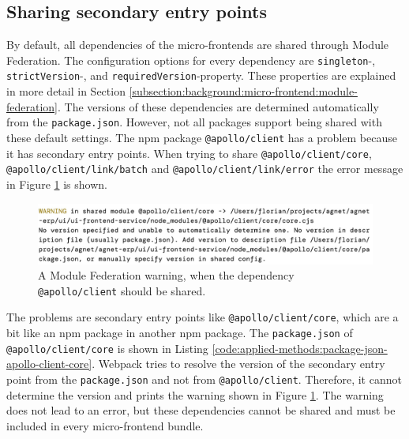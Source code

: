 \subsection{Sharing secondary entry points}\label{subsection:applied-methods:prototypical-implementation:sharing
-secondary-entrypoints}

By default, all dependencies of the micro-frontends are shared through Module Federation. The configuration options for every dependency are \texttt{singleton}-, \texttt{strictVersion}-, and \texttt{requiredVersion}-property. These properties are explained in more detail in Section \ref{subsection:background:micro-frontend:module-federation}. The versions of these dependencies are determined automatically from the \texttt{package.json}. However, not all packages support being shared with these default settings. The npm package \texttt{@apollo/client} has a problem because it has secondary entry points. When trying to share \texttt{@apollo/client/core}, \texttt{@apollo/client/link/batch} and \texttt{@apollo/client/link/error} the error message in Figure \ref{fig:applied-methods:sharing-secondary-entrypoints-error} is shown.

\ifshowImages
  \begin{figure}[H]
  \centering
  \includegraphics[width=1\linewidth]{images/applied-methods/prototypical-implementation/module-federation-apollo-warning.jpg}
  \caption{A Module Federation warning, when the dependency \texttt{@apollo/client} should be shared.}\label{fig:applied-methods:sharing-secondary-entrypoints-error}
  \end{figure}
\fi

\noindent The problems are secondary entry points like \texttt{@apollo/client/core}, which are a bit like an npm package in another npm package. The \texttt{package.json} of \texttt{@apollo/client/core} is shown in Listing \ref{code:applied-methods:package-json-apollo-client-core}. Webpack tries to resolve the version of the secondary entry point from the \texttt{package.json} and not from \texttt{@apollo/client}. Therefore, it cannot determine the version and prints the warning shown in Figure \ref{fig:applied-methods:sharing-secondary-entrypoints-error}. The warning does not lead to an error, but these dependencies cannot be shared and must be included in every micro-frontend bundle.

